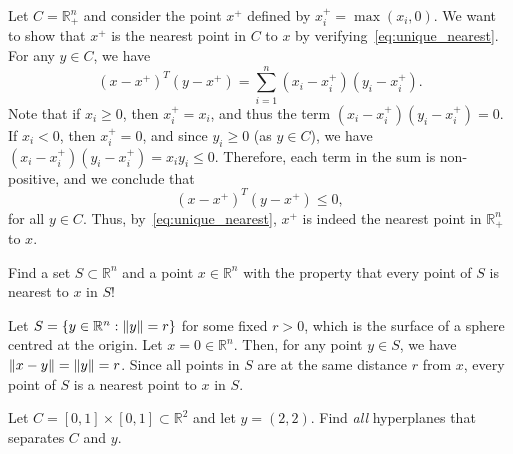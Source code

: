 \begin{solution}
  Let $C = \mathbb{R}^n_+$ and consider the point $x^+$ defined by $x^+_i = \max(x_i, 0)$.
  We want to show that $x^+$ is the nearest point in $C$ to $x$ by verifying~\eqref{eq:unique_nearest}.
  For any $y \in C$, we have
  \begin{equation}
    (x - x^+)^T (y - x^+) = \sum_{i=1}^n (x_i - x^+_i)(y_i - x^+_i).
  \end{equation}
  Note that if $x_i \geq 0$, then $x^+_i = x_i$, and thus the term $(x_i - x^+_i)(y_i - x^+_i) = 0$.
  If $x_i < 0$, then $x^+_i = 0$, and since $y_i \geq 0$ (as $y \in C$), we have $(x_i - x^+_i)(y_i - x^+_i) = x_i y_i \leq 0$.
  Therefore, each term in the sum is non-positive, and we conclude that
  \begin{equation}
    (x - x^+)^T (y - x^+) \leq 0,
  \end{equation}
  for all $y \in C$.
  Thus, by~\eqref{eq:unique_nearest}, $x^+$ is indeed the nearest point in $\mathbb{R}^n_+$ to $x$.
\end{solution}

\begin{exercise}
  Find a set $S \subset \mathbb{R}^n$ and a point $x \in \mathbb{R}^n$ with the property that every point of $S$ is nearest to $x$ in $S$!
\end{exercise}

\begin{solution}
  Let $S = \{ y \in \mathbb{R}^n : \lVert y\rVert = r \}$ for some fixed $r > 0$, which is the surface of a sphere centred at the origin.
  Let $x = 0 \in \mathbb{R}^n$.
  Then, for any point $y \in S$, we have $\lVert x - y\rVert = \lVert y\rVert = r$.
  Since all points in $S$ are at the same distance $r$ from $x$, every point of $S$ is a nearest point to $x$ in $S$.
\end{solution}


\begin{exercise}
  Let $C = [0,1] \times [0,1] \subset \mathbb{R}^2$ and let $y = (2,2)$.
  Find \emph{all} hyperplanes that separates $C$ and $y$.
\end{exercise}

